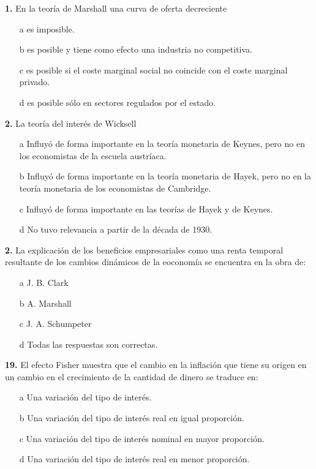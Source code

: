 \documentclass{nuevotema}
\begin{document}
\textbf{1.} En la teoría de Marshall una curva de oferta decreciente
\begin{itemize}
	\item[a] es imposible.
	\item[b] es posible y tiene como efecto una industria no competitiva.
	\item[c] es posible si el coste marginal social no coincide con el coste marginal privado.
	\item[d] es posible sólo en sectores regulados por el estado.
\end{itemize}

\textbf{2.} La teoría del interés de Wicksell
\begin{itemize}
	\item[a] Influyó de forma importante en la teoría monetaria de Keynes, pero no en los economistas de la escuela austríaca.
	\item[b] Influyó de forma importante en la teoría monetaria de Hayek, pero no en la teoría monetaria de los economistas de Cambridge.
	\item[c] Influyó de forma importante en las teorías de Hayek y de Keynes.
	\item[d] No tuvo relevancia a partir de la década de 1930.
\end{itemize}

\textbf{2.} La explicación de los beneficios empresariales como una renta temporal resultante de los cambios dinámicos de la eoconomía se encuentra en la obra de:
\begin{itemize}
	\item[a] J. B. Clark
	\item[b] A. Marshall
	\item[c] J. A. Schumpeter
	\item[d] Todas las respuestas son correctas.
\end{itemize}

\textbf{19.} El efecto Fisher muestra que el cambio en la inflación que tiene su origen en un cambio en el crecimiento de la cantidad de dinero se traduce en:
\begin{itemize}
	\item[a] Una variación del tipo de interés.
	\item[b] Una variación del tipo de interés real en igual proporción.
	\item[c] Una variación del tipo de interés nominal en mayor proporción.
	\item[d] Una variación del tipo de interés real en menor proporción.
\end{itemize}
\end{document}
